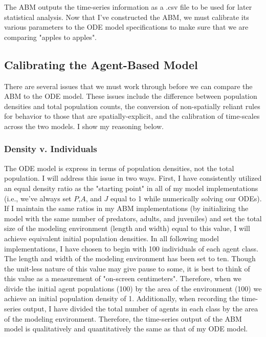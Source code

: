 \documentclass[12pt]{article}
\begin{document}
The ABM outputs the time-series information as a .csv file to be used for later statistical analysis. Now that I've constructed the ABM, we must calibrate its various parameters to the ODE model specifications to make sure that we are comparing "apples to apples".

\subsection{Calibrating the Agent-Based Model}

There are several issues that we must work through before we can compare the ABM to the ODE model. These issues include the difference between population densities and total population counts, the conversion of non-spatially reliant rules for behavior to those that are spatially-explicit, and the calibration of time-scales across the two models. I show my reasoning below.

\subsubsection{Density v. Individuals}

The ODE model is express in terms of population densities, not the total population. I will address this issue in two ways. First,  I have consistently utilized an equal density ratio as the "starting point" in all of my model implementations (i.e., we've always set $P$,$A$, and $J$ equal to 1 while numerically solving our ODEs). If I maintain the same ratios in my ABM implementations (by initializing the model with the same number of predators, adults, and juveniles) and set the total size of the modeling environment (length and width) equal to this value, I will achieve equivalent initial population densities. In all following model implementations, I have chosen to begin with 100 individuals of each agent class. The length and width of the modeling environment has been set to ten. Though the unit-less nature of this value may give pause to some, it is best to think of this value as a measurement of "on-screen centimeters". Therefore, when we divide the initial agent populations (100) by the area of the environment (100) we achieve an initial population density of 1. Additionally, when recording the time-series output, I have divided the total number of agents in each class by the area of the modeling environment. Therefore, the time-series output of the ABM model is qualitatively and quantitatively the same as that of my ODE model.
\end{document}
